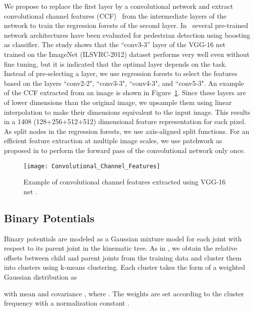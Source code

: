 \documentclass[a4paper, 10pt, conference]{ieeeconf}      \usepackage{FG2017}
\begin{document}
We propose to replace the first layer by a convolutional network and extract convolutional channel features (CCF)~\cite{yang_iccv2015} from the intermediate layers of the network to train the regression forests of the second layer. In~\cite{yang_iccv2015} several pre-trained network architectures have been evaluated for pedestrian detection using boosting as classifier. The study shows that the ``conv3-3'' layer of the VGG-16 net~\cite{Simonyan14c} trained on the ImageNet (ILSVRC-2012) dataset performs very well even without fine tuning, but it is indicated that the optimal layer depends on the task. Instead of pre-selecting a layer, we use regression forests to select the features based on the layers ``conv2-2", ``conv3-3", ``conv4-3", and ``conv5-3". An example of the CCF extracted from an image is shown in Figure~\ref{fig:ccf}. Since these layers are of lower dimensions than the original image, we upsample them using linear interpolation to make their dimensions equivalent to the input image. This results in a 1408 (128+256+512+512) dimensional feature representation for each pixel. As split nodes in the regression forests, we use axis-aligned split functions. For an efficient feature extraction at multiple image scales, we use patchwork as proposed in \cite{iandola2014densenet} to perform the forward pass of the convolutional network only once. 


\begin{figure}
\centering
\captionsetup[figure]{skip=0pt}
\texttt{[image: Convolutional\_Channel\_Features]}
\caption{Example of convolutional channel features extracted using VGG-16 net \cite{Simonyan14c}.}
\label{fig:ccf}
\end{figure}

\subsection{Binary Potentials}
\label{sec:binary_potentials}
Binary potentials  are modeled as a Gaussian mixture model for each joint  with respect to its parent joint  in the kinematic tree. As in \cite{dantone_tpami2014}, we obtain the relative offsets between child and parent joints from the training data and cluster them into  clusters using k-means clustering. Each cluster  takes the form of a weighted Gaussian distribution as

with mean  and covariance , where . The weights  are set according to the cluster frequency  with a normalization constant  \cite{dantone_tpami2014}. 
\end{document}

